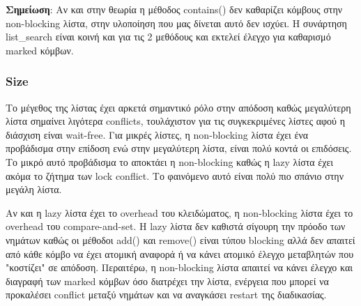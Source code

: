 \documentclass[../final_report.tex]{subfiles}
\begin{document}
\textbf{Σημείωση}: Αν και στην θεωρία η μέθοδος contains() δεν καθαρίζει κόμβους στην non-blocking λίστα, στην υλοποίηση που μας δίνεται
αυτό δεν ισχύει. Η συνάρτηση list\_search είναι κοινή και για τις 2 μεθόδους και εκτελεί έλεγχο για καθαρισμό marked κόμβων.

\subsubsection*{Size}
Το μέγεθος της λίστας έχει αρκετά σημαντικό ρόλο στην απόδοση καθώς μεγαλύτερη λίστα σημαίνει λιγότερα conflicts, τουλάχιστον για τις συγκεκριμένες
λίστες αφού η διάσχιση είναι wait-free. Για μικρές λίστες, η non-blocking λίστα έχει ένα προβάδισμα στην επίδοση ενώ στην μεγαλύτερη λίστα, είναι
πολύ κοντά οι επιδόσεις. Το μικρό αυτό προβάδισμα το αποκτάει η non-blocking καθώς η lazy λίστα έχει ακόμα το ζήτημα των lock conflict. Το φαινόμενο αυτό
είναι πολύ πιο σπάνιο στην μεγάλη λίστα.

Αν και η lazy λίστα έχει το overhead του κλειδώματος, η non-blocking λίστα έχει το 
overhead του compare-and-set. Η lazy λίστα δεν καθιστά σίγουρη την πρόοδο των νημάτων καθώς οι μέθοδοι add() και remove() είναι
τύπου blocking αλλά δεν απαιτεί από κάθε κόμβο να έχει ατομική αναφορά ή να κάνει ατομικό έλεγχο μεταβλητών που "κοστίζει" σε απόδοση.
Περαιτέρω, η non-blocking λίστα απαιτεί να κάνει έλεγχο και διαγραφή των marked κόμβων όσο διατρέχει την λίστα, ενέργεια που μπορεί να
προκαλέσει conflict μεταξύ νημάτων και να αναγκάσει restart της διαδικασίας.
\end{document}
